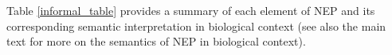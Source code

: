 \documentclass[12pt]{article}	%
\begin{document}
Table \ref{informal_table} provides a summary of each element of NEP and its corresponding semantic interpretation in biological context (see also the main text for more on the semantics of NEP in biological context).

\begin{comment}
	The network can equivalently be represented as an adjacency matrix $M$, whereby a non-zero entry $m_{jk}$ indicates the existence of an interaction between genes $g_j$ and $g_k$
	in which the latter is the target of the former.
	The sign of a non-zero entry in $M$ indicates whether $g_j$'s effect on its target $g_k$ is promotional or inhibitory in nature, indicated with
	$+1$ or $-1$, respectively.
	A hypothetical Oracle advice (OA) on all or some of the genes simulates the evolutionary pressure on the
	network, and
	is represented as a ternary sequence $A = (a_1,a_2,\dots,a_n)$ where: $a_j=+1$ ($a_j=-1$) implies
	the organism would be better off conserving (deleting) $g_j$; $a_j=0$ implies the Oracle has no opinion on $g_j$.
	While $m_{jk}$ describes what the effect of $g_j$ on $g_k$ actually \textit{is}, $a_k$ describes whether that effect \textit{should} ideally be.
	An interaction $m_{jk}$
	is beneficial if it is in agreement with what the Oracle
	says $g_k$ should be (i.e. either $(m_{jk}=+1$ AND $a_k=+1)$ OR $(m_{jk}=-1$ AND $a_k=-1)$), and damaging if it is
	in disagreement with what the Oracle says $g_k$ should be (i.e. either $(m_{jk}=+1$ AND $a_k=-1)$ OR $(m_{jk}=-1$ AND $a_k=+1)$).
	Each gene $g_j$ is henceforth assigned a benefit (damage) score $b_j$ ($d_j$) depending on how many beneficial (damaging)
	interactions it \textit{projects} onto or \textit{attracts} from other genes through its
	outgoing and incoming edges, respectively.
	Each beneficial (damaging) interaction therefore adds $|m_{jk}|$ to the benefit (damage) score of both the source gene $g_j$ and the target gene $g_k$.
	A gene can therefore have both non-zero benefit and damage score under a given pressure scenario, and so the optimization problem is:
	what subset of genes should be conserved and which should be deleted (=define $f$) so as to maximize (minimize) the number of
	interactions that are in agreement (disagreement) with the OA?
	The OA can be imposed by conserving (deleting) every gene $\boldsymbol{g_j}$ where $a_j = +1$ ($a_j=-1$).
	However,
	conserving $\boldsymbol{g_j}$ can inadvertently contribute to a violation of  the OA if
	$g_j$ happens to be a promoter (inhibitor) of one or more $g_k$ where $a_k=-1$($a_k=+1$), and
	deleting $\boldsymbol{g_j}$ can inadvertently contribute to a violation of the OA if $g_j$
	happens to be a promoter (repressor) of one or more $g_k$ where $a_k=+1$ ($a_k=-1$).
	The idealistic pursuit of enforcing an OA is complicated by the reality of network connectivity.
\end{comment}
\end{document}
